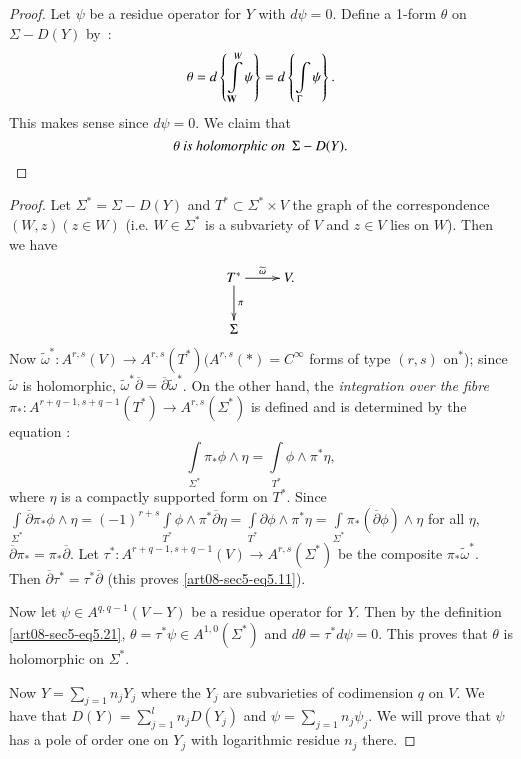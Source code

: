 \begin{proof}
Let $\psi$ be a residue operator for $Y$ with $d\psi=0$. Define a 1-form $\theta$ on $\Sigma-D(Y)$ by~:
\begin{equation}
\theta=d\left\{\int\limits^{W}_{\mathbf{W}}\psi\right\}=d\left\{\int\limits_{\Gamma}\psi\right\}.\label{art08-sec5-eq5.21}
\end{equation}
This makes sense since $d\psi=0$. We claim that
$$
\theta\text{~\em is holomorphic on~ } \Sigma-D(Y).
$$
\end{proof}

\begin{proof}
Let $\Sigma^{*}=\Sigma-D(Y)$ and $T^{*}\subset \Sigma^{*}\times V$ the graph of the correspondence $(W,z)(z\in W)$ (i.e. $W\in \Sigma^{*}$ is a subvariety of $V$ and $z\in V$ lies on $W$). Then we have
\[
\xymatrix{
T^{*}\ar[r]^-{\widetilde{\omega}}\ar[d]^-{\pi} & V.\\
\Sigma & 
}
\]\pageoriginale
Now $\widetilde{\omega}^{*}:A^{r,s}(V)\to A^{r,s}(T^{*})(A^{r,s}(*)=C^{\infty}$ forms of type $(r,s)$ on$^{*}$); since $\widetilde{\omega}$ is holomorphic, $\widetilde{\omega}^{*}\overline{\partial}=\overline{\partial}\widetilde{\omega}^{*}$. On the other hand, the {\em integration over the fibre} $\pi_{*}:A^{r+q-1,s+q-1}(T^{*})\to A^{r,s}(\Sigma^{*})$ is defined and is determined by the equation :
\setcounter{equation}{21}
\begin{equation}
\int\limits_{\Sigma^{*}}\pi_{*}\phi\wedge \eta=\int\limits_{T^{*}}\phi\wedge \pi^{*}\eta,\label{art08-sec5-eq5.22}
\end{equation}
where $\eta$ is a compactly supported form on $T^{*}$. Since $\int\limits_{\Sigma^{*}}\overline{\partial}\pi_{*}\phi\wedge \eta=(-1)^{r+s}\int\limits_{T^{*}}\phi\wedge \pi^{*}\overline{\partial}\eta=\int\limits_{T^{*}}\partial \phi\wedge \pi^{*}\eta=\int\limits_{\Sigma^{*}}\pi_{*}(\overline{\partial}\phi)\wedge \eta$ for all $\eta$, $\overline{\partial}\pi_{*}=\pi_{*}\overline{\partial}$. Let $\tau^{*}:A^{r+q-1,s+q-1}(V)\to A^{r,s}(\Sigma^{*})$ be the composite $\pi_{*}\widetilde{\omega}^{*}$. Then $\overline{\partial}\tau^{*}=\tau^{*}\overline{\partial}$ (this proves \eqref{art08-sec5-eq5.11}).

Now let $\psi\in A^{q,q-1}(V-Y)$ be a residue operator for $Y$. Then by the definition \eqref{art08-sec5-eq5.21}, $\theta=\tau^{*}\psi\in A^{1,0}(\Sigma^{*})$ and $d\theta=\tau^{*}d\psi=0$. This proves that $\theta$ is holomorphic on $\Sigma^{*}$.

Now $Y=\sum\limits_{j=1}n_{j}Y_{j}$ where the $Y_{j}$ are subvarieties of codimension $q$ on $V$. We have that $D(Y)=\sum\limits^{l}_{j=1}n_{j}D(Y_{j})$ and $\psi=\sum\limits_{j=1}n_{j}\psi_{j}$. We will prove that $\psi$ has a pole of order one on $Y_{j}$ with logarithmic residue $n_{j}$ there.
\end{proof}

